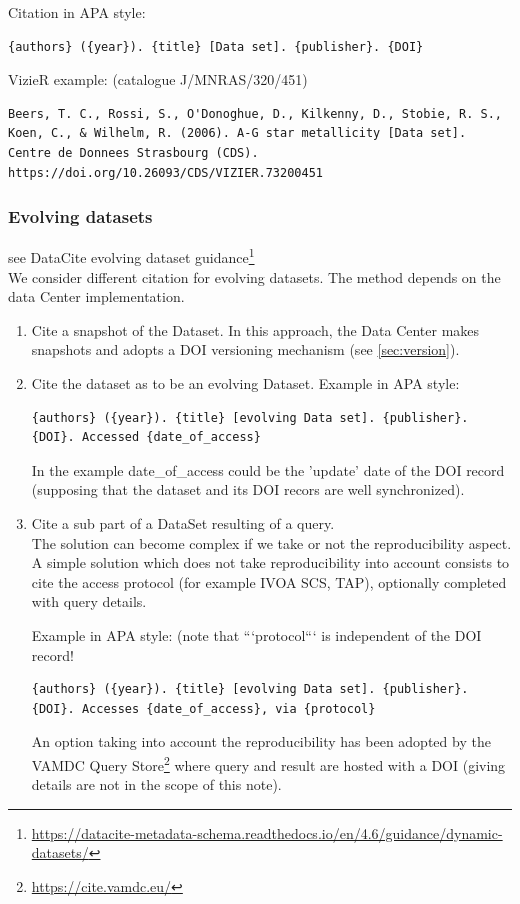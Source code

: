 \documentclass[11pt,a4paper]{ivoa}
\begin{document}
Citation in APA style:
\begin{verbatim}
{authors} ({year}). {title} [Data set]. {publisher}. {DOI}
\end{verbatim}

VizieR example: (catalogue J/MNRAS/320/451)
\begin{verbatim}
Beers, T. C., Rossi, S., O'Donoghue, D., Kilkenny, D., Stobie, R. S.,
Koen, C., & Wilhelm, R. (2006). A-G star metallicity [Data set]. 
Centre de Donnees Strasbourg (CDS). https://doi.org/10.26093/CDS/VIZIER.73200451
\end{verbatim}

\subsubsection{Evolving datasets}

see DataCite evolving dataset guidance\footnote{\url{https://datacite-metadata-schema.readthedocs.io/en/4.6/guidance/dynamic-datasets/}}\\

We consider different citation for evolving datasets. The method depends on the data Center implementation.

\begin{enumerate}
  \item Cite a snapshot of the Dataset. In this approach, the Data Center makes snapshots and adopts a DOI versioning mechanism (see \ref{sec:version}).
  \item  Cite the dataset as to be an evolving Dataset.
         Example in APA style:
\begin{verbatim}
{authors} ({year}). {title} [evolving Data set]. {publisher}.
{DOI}. Accessed {date_of_access}
\end{verbatim}

		In the example {date\_of\_access} could be the 'update' date of the DOI record (supposing that the dataset and its DOI recors are well synchronized).

	\item Cite a sub part of a DataSet resulting of a query.\\ 
	The solution can become complex if we take or not the reproducibility aspect.
	A simple solution which does not take reproducibility into account consists to cite the access protocol (for example IVOA SCS, TAP), optionally completed with query details.

	Example in APA style: (note that ```protocol``` is independent of the DOI record!
\begin{verbatim}
{authors} ({year}). {title} [evolving Data set]. {publisher}. 
{DOI}. Accesses {date_of_access}, via {protocol}	
\end{verbatim}

	An option taking into account the reproducibility has been adopted by the VAMDC Query Store\footnote{\url{https://cite.vamdc.eu/}} where query and result are hosted with a DOI (giving details are not in the scope of this note).
\end{enumerate}
\end{document}
